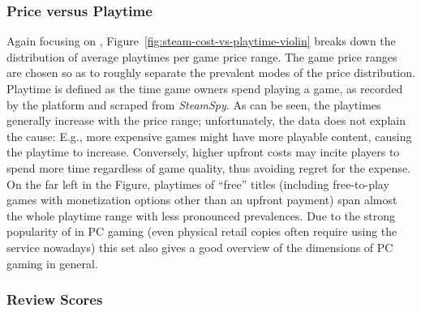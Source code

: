 \subsubsection{Price versus Playtime}
Again focusing on \steam,
Figure~\ref{fig:steam-cost-vs-playtime-violin} breaks down the
distribution of average playtimes per game price range. The game price
ranges are chosen so as to roughly separate the prevalent modes of the
price distribution.
Playtime is defined as the time game owners spend playing a game, as
recorded by the \steam platform and scraped from \textit{SteamSpy}. As
can be seen, the playtimes generally increase with the price range;
unfortunately, the data does not explain the cause: E.g., more expensive
games might have more playable content, causing the playtime to
increase. Conversely, higher upfront costs may incite players to spend
more time regardless of game quality, thus avoiding regret for the
expense. On the far left in the Figure, playtimes of ``free'' titles
(including free-to-play games with monetization options other than an
upfront payment) span almost the whole playtime range with less
pronounced prevalences.
Due to the strong popularity of \steam in PC gaming (even physical
retail copies often require using the service nowadays) this set also
gives a good overview of the dimensions of PC gaming in general.


\subsubsection{Review Scores}

